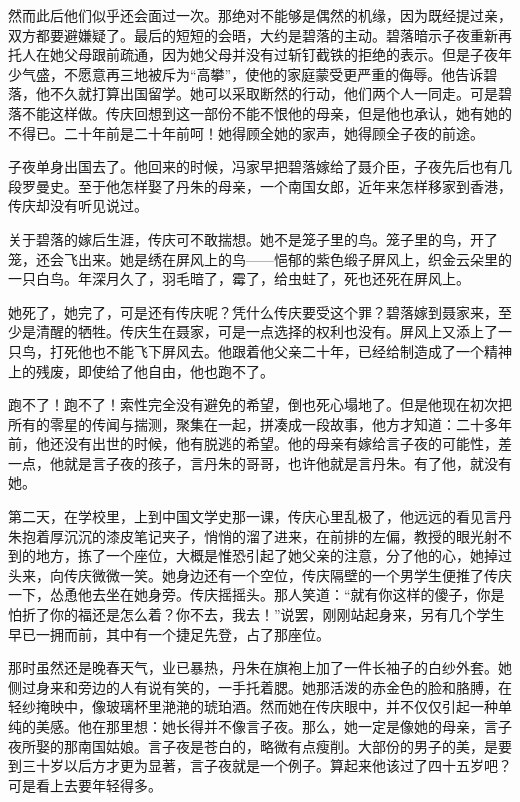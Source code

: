 \par 然而此后他们似乎还会面过一次。那绝对不能够是偶然的机缘，因为既经提过亲，双方都要避嫌疑了。最后的短短的会晤，大约是碧落的主动。碧落暗示子夜重新再托人在她父母跟前疏通，因为她父母并没有过斩钉截铁的拒绝的表示。但是子夜年少气盛，不愿意再三地被斥为“高攀”，使他的家庭蒙受更严重的侮辱。他告诉碧落，他不久就打算出国留学。她可以采取断然的行动，他们两个人一同走。可是碧落不能这样做。传庆回想到这一部份不能不恨他的母亲，但是他也承认，她有她的不得已。二十年前是二十年前呵！她得顾全她的家声，她得顾全子夜的前途。
\par 子夜单身出国去了。他回来的时候，冯家早把碧落嫁给了聂介臣，子夜先后也有几段罗曼史。至于他怎样娶了丹朱的母亲，一个南国女郎，近年来怎样移家到香港，传庆却没有听见说过。
\par 关于碧落的嫁后生涯，传庆可不敢揣想。她不是笼子里的鸟。笼子里的鸟，开了笼，还会飞出来。她是绣在屏风上的鸟——悒郁的紫色缎子屏风上，织金云朵里的一只白鸟。年深月久了，羽毛暗了，霉了，给虫蛀了，死也还死在屏风上。
\par 她死了，她完了，可是还有传庆呢？凭什么传庆要受这个罪？碧落嫁到聂家来，至少是清醒的牺牲。传庆生在聂家，可是一点选择的权利也没有。屏风上又添上了一只鸟，打死他也不能飞下屏风去。他跟着他父亲二十年，已经给制造成了一个精神上的残废，即使给了他自由，他也跑不了。
\par 跑不了！跑不了！索性完全没有避免的希望，倒也死心塌地了。但是他现在初次把所有的零星的传闻与揣测，聚集在一起，拼凑成一段故事，他方才知道：二十多年前，他还没有出世的时候，他有脱逃的希望。他的母亲有嫁给言子夜的可能性，差一点，他就是言子夜的孩子，言丹朱的哥哥，也许他就是言丹朱。有了他，就没有她。
\par 第二天，在学校里，上到中国文学史那一课，传庆心里乱极了，他远远的看见言丹朱抱着厚沉沉的漆皮笔记夹子，悄悄的溜了进来，在前排的左偏，教授的眼光射不到的地方，拣了一个座位，大概是惟恐引起了她父亲的注意，分了他的心，她掉过头来，向传庆微微一笑。她身边还有一个空位，传庆隔壁的一个男学生便推了传庆一下，怂恿他去坐在她身旁。传庆摇摇头。那人笑道：“就有你这样的傻子，你是怕折了你的福还是怎么着？你不去，我去！”说罢，刚刚站起身来，另有几个学生早已一拥而前，其中有一个捷足先登，占了那座位。
\par 那时虽然还是晚春天气，业已暴热，丹朱在旗袍上加了一件长袖子的白纱外套。她侧过身来和旁边的人有说有笑的，一手托着腮。她那活泼的赤金色的脸和胳膊，在轻纱掩映中，像玻璃杯里滟滟的琥珀酒。然而她在传庆眼中，并不仅仅引起一种单纯的美感。他在那里想：她长得并不像言子夜。那么，她一定是像她的母亲，言子夜所娶的那南国姑娘。言子夜是苍白的，略微有点瘦削。大部份的男子的美，是要到三十岁以后方才更为显著，言子夜就是一个例子。算起来他该过了四十五岁吧？可是看上去要年轻得多。
